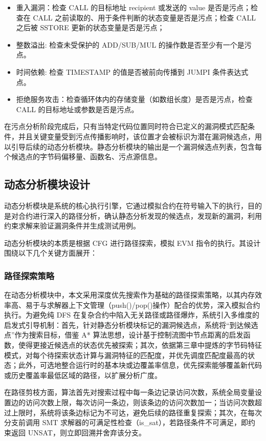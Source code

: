 \documentclass[print, master, vlined, timesmath]{DissertUESTC}
\begin{document}
\begin{itemize}
    \item 重入漏洞：检查 CALL 的目标地址 recipient 或发送的 value 是否是污点；检查在 CALL 之前读取的、用于条件判断的状态变量是否是污点；检查 CALL 之后被 SSTORE 更新的状态变量是否是污点；
    \item 整数溢出: 检查未受保护的 ADD/SUB/MUL 的操作数是否至少有一个是污点。
    \item 时间依赖: 检查 TIMESTAMP 的值是否被前向传播到 JUMPI 条件表达式点。
    \item 拒绝服务攻击：检查循环体内的存储变量（如数组长度）是否是污点，检查 CALL 的目标地址或参数是否是污点。
\end{itemize}

在污点分析阶段完成后，只有当特定代码位置同时符合已定义的漏洞模式匹配条件，并且关键变量受到污点传播影响时，该位置才会被标识为潜在漏洞候选点，用以引导后续的动态分析模块。静态分析模块的输出是一个漏洞候选点列表，包含每个候选点的字节码偏移量、函数名、污点源信息。

\subsection{动态分析模块设计}

动态分析模块是系统的核心执行引擎，它通过模拟合约在符号输入下的执行，目的是对合约进行深入的路径分析，确认静态分析发现的候选点，发现新的漏洞，利用约束求解来验证漏洞条件并生成测试用例。

动态分析模块的本质是根据 CFG 进行路径探索，模拟 EVM 指令的执行。其设计围绕以下几个关键方面展开：

\subsubsection{路径探索策略}
在动态分析模块中，本文采用深度优先搜索作为基础的路径探索策略，以其内存效率高、易于与求解器上下文管理（push()/pop()操作）配合的优势，深入模拟合约执行。为避免纯 DFS 在复杂合约中陷入无关路径或路径爆炸，系统引入多维度的启发式引导机制：首先，针对静态分析模块标记的漏洞候选点，系统将“到达候选点”作为搜索目标，借鉴 A*\textsuperscript{\cite{Hart1968}} 算法思想，设计基于控制流图中节点距离的启发函数，使得更接近候选点的状态优先被探索；其次，依据第三章中提炼的字节码特征模式，对每个待探索状态计算与漏洞特征的匹配度，并优先调度匹配度最高的状态；此外，可选地整合运行时的基本块或边覆盖率信息，优先探索能够覆盖新代码或历史覆盖率最低区域的路径，以扩展分析广度。  

在路径剪枝方面，算法首先对搜索过程中每一条边记录访问次数，系统全局变量设置边的访问次数上限，每次访问一条边，则该条边的访问次数加一；当访问次数超过上限时，系统将该条边标记为不可达，避免后续的路径重复探索；其次，在每次分支前调用 SMT 求解器的可满足性检查（is\_sat），若路径条件不可满足，即约束返回 UNSAT，则立即回溯并舍弃该分支。  
\end{document}
